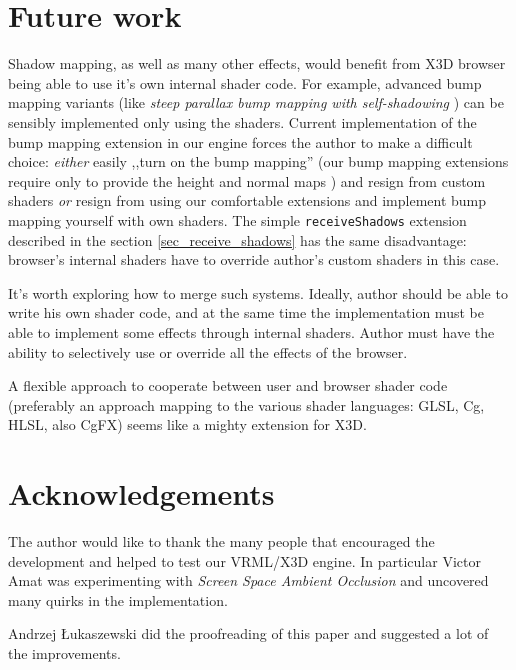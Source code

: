 \documentclass{acmsiggraph}                     %
\begin{document}
\section{Future work}


Shadow mapping, as well as many other effects,
would benefit from X3D browser being able to use it's own
internal shader code.
For example, advanced bump mapping variants
(like \emph{steep parallax bump mapping with self-shadowing} \cite{parallaxbump})
can be sensibly implemented only using the shaders.
Current implementation of the bump mapping extension in our engine
forces the author to make a difficult choice:
\emph{either} easily ,,turn on the bump mapping'' (our bump mapping extensions
require only to provide the height and normal maps \cite{vrmleng:parallaxbump}) and resign
from custom shaders \emph{or} resign from using our comfortable
extensions and implement bump mapping yourself with own shaders.
The simple \texttt{receiveShadows} extension described in the section
\ref{sec_receive_shadows} has the same disadvantage: browser's internal shaders
have to override author's custom shaders in this case.

It's worth exploring how to merge such systems. Ideally, author should be able
to write his own shader code, and at the same time the implementation
must be able to implement some effects through internal shaders.
Author must have the ability to selectively use or override
all the effects of the browser.

A flexible approach to cooperate between user and browser shader code
(preferably an approach mapping to the various shader languages:
GLSL, Cg, HLSL, also CgFX) seems like a mighty extension for X3D.

\section*{Acknowledgements}

The author would like to thank the many people that encouraged the development
and helped to test our VRML/X3D engine. In particular Victor Amat
was experimenting with \emph{Screen Space Ambient Occlusion}
and uncovered many quirks in the implementation.

Andrzej {\L}ukaszewski did the proofreading of this paper and suggested
a lot of the improvements.
\end{document}
